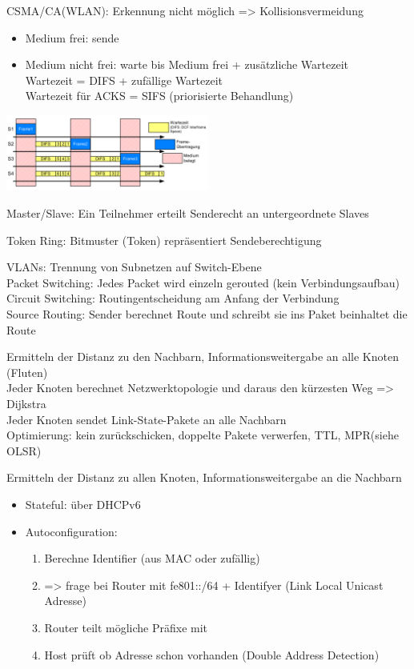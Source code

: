 CSMA/CA(WLAN): Erkennung nicht möglich => Kollisionsvermeidung
\begin{itemize}
\item Medium frei: sende
\item Medium nicht frei: warte bis Medium frei + zusätzliche Wartezeit\\
Wartezeit = DIFS + zufällige Wartezeit \\
Wartezeit für ACKS = SIFS (priorisierte Behandlung)
\end{itemize}

\includegraphics[width=0.5\textwidth]{CSMA-CA}




Master/Slave: Ein Teilnehmer erteilt Senderecht an untergeordnete Slaves

Token Ring: Bitmuster (Token) repräsentiert Sendeberechtigung

VLANs: Trennung von Subnetzen auf Switch-Ebene\\
Packet Switching: Jedes Packet wird einzeln gerouted (kein Verbindungsaufbau)\\
Circuit Switching: Routingentscheidung am Anfang der Verbindung\\
Source Routing: Sender berechnet Route und schreibt sie ins Paket beinhaltet die Route

Ermitteln der Distanz zu den Nachbarn, Informationsweitergabe an alle Knoten (Fluten)\\
Jeder Knoten berechnet Netzwerktopologie und daraus den kürzesten Weg => Dijkstra\\


Jeder Knoten sendet Link-State-Pakete an alle Nachbarn \\
Optimierung: kein zurückschicken, doppelte Pakete verwerfen, TTL, MPR(siehe OLSR)


Ermitteln der Distanz zu allen Knoten, Informationsweitergabe an die Nachbarn


\begin{minipage}{0.5\textwidth}
\begin{itemize}
\item Stateful: über DHCPv6
\item Autoconfiguration: 
\begin{enumerate}
\item Berechne Identifier (aus MAC oder zufällig)
\item => frage bei Router mit fe801::/64 + Identifyer (Link Local Unicast Adresse)
\item Router teilt mögliche Präfixe mit
\item Host prüft ob Adresse schon vorhanden (Double Address Detection)
\end{enumerate}
\end{itemize}
\end{minipage}


